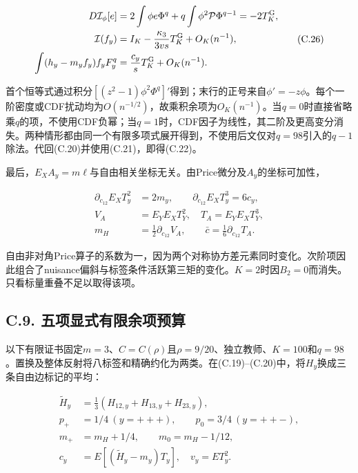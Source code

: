 \documentclass[11pt,a4paper]{article}
\begin{document}
\[
\begin{aligned}
D\mathcal I_\phi[e]&=2\int\phi e\Phi^q+q\int\phi^2\mathcal P\Phi^{q-1}
=-2T_K^{\rm G},\\
\mathcal I(f_y)&=I_K-\frac{\kappa_3}{3vs}T_K^{\rm G}+O_K(n^{-1}),\\
\int(h_y-m_yf_y)f_yF_y^q&=\frac{c_y}{s}T_K^{\rm G}+O_K(n^{-1}).
\end{aligned}
\tag{C.26}
\]

首个恒等式通过积分\([(z^2-1)\phi^2\Phi^q]'\)得到；末行的正号来自\(\phi'=-z\phi\)。每个一阶密度或CDF扰动均为\(O(n^{-1/2})\)，故乘积余项为\(O_K(n^{-1})\)。当\(q=0\)时直接省略乘\(q\)的项，不使用CDF负幂；当\(q=1\)时，CDF因子为线性，其二阶及更高变分消失。两种情形都由同一个有限多项式展开得到，不使用后文仅对\(q=98\)引入的\(q-1\)除法。代回(C.20)并使用(C.21)，即得(C.22)。

最后，\(E_XA_y=m\ell\)与自由相关坐标无关。由Price微分及\(A_y\)的坐标可加性，

\[
\begin{aligned}
\partial_{c_{12}}E_XT_y^2&=2m_y,\qquad
\partial_{c_{12}}E_XT_y^3=6c_y,\\
V_A&=E_YE_XT_Y^2,\quad T_A=E_YE_XT_Y^3,\\
m_H&=\tfrac12\partial_{c_{12}}V_A,\qquad
\bar c=\tfrac16\partial_{c_{12}}T_A.
\end{aligned}
\tag{C.27}
\]

自由非对角Price算子的系数为一，因为两个对称协方差元素同时变化。次阶项因此组合了nuisance偏斜与标签条件活跃第三矩的变化。\(K=2\)时因\(B_2=0\)而消失。只看标量重叠不足以取得该项。

\subsection*{C.9.
五项显式有限余项预算}\label{c.9.-ux4e94ux9879ux663eux5f0fux6709ux9650ux4f59ux9879ux9884ux7b97}

以下有限证书固定\(m=3\)、\(C=C(\rho)\)且\(\rho=9/20\)、独立教师、\(K=100\)和\(q=98\)。置换及整体反射将八标签和精确约化为两类。在(C.19)--(C.20)中，将\(H_y\)换成三条自由边标记的平均：

\[
\begin{aligned}
\widetilde H_y&=\tfrac13(H_{12,y}+H_{13,y}+H_{23,y}),\\
p_+&=1/4\ (y=+++),\qquad p_0=3/4\ (y=++-),\\
m_+&=m_H+1/4,\qquad m_0=m_H-1/12,\\
c_y&=E[(\widetilde H_y-m_y)T_y],\quad v_y=ET_y^2.
\end{aligned}
\tag{C.28}
\]
\end{document}
